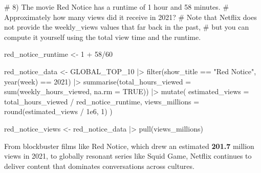 \documentclass[
  12pt,
  letterpaper,
  DIV=11,
  numbers=noendperiod]{scrartcl}
\newenvironment{Shaded}{\begin{snugshade}}{\end{snugshade}}
\newcommand{\AttributeTok}[1]{\textcolor[rgb]{0.40,0.45,0.13}{#1}}
\newcommand{\CommentTok}[1]{\textcolor[rgb]{0.37,0.37,0.37}{#1}}
\newcommand{\ConstantTok}[1]{\textcolor[rgb]{0.56,0.35,0.01}{#1}}
\newcommand{\DecValTok}[1]{\textcolor[rgb]{0.68,0.00,0.00}{#1}}
\newcommand{\FloatTok}[1]{\textcolor[rgb]{0.68,0.00,0.00}{#1}}
\newcommand{\FunctionTok}[1]{\textcolor[rgb]{0.28,0.35,0.67}{#1}}
\newcommand{\NormalTok}[1]{\textcolor[rgb]{0.00,0.23,0.31}{#1}}
\newcommand{\OtherTok}[1]{\textcolor[rgb]{0.00,0.23,0.31}{#1}}
\newcommand{\SpecialCharTok}[1]{\textcolor[rgb]{0.37,0.37,0.37}{#1}}
\newcommand{\StringTok}[1]{\textcolor[rgb]{0.13,0.47,0.30}{#1}}
\begin{document}
\begin{Shaded}
\begin{Highlighting}[]
\CommentTok{\# 8) The movie Red Notice has a runtime of 1 hour and 58 minutes. }
\CommentTok{\# Approximately how many views did it receive in 2021? }
\CommentTok{\# Note that Netflix does not provide the weekly\_views values that far back in the past,}
\CommentTok{\# but you can compute it yourself using the total view time and the runtime.}

\NormalTok{red\_notice\_runtime }\OtherTok{\textless{}{-}} \DecValTok{1} \SpecialCharTok{+} \DecValTok{58}\SpecialCharTok{/}\DecValTok{60}

\NormalTok{red\_notice\_data }\OtherTok{\textless{}{-}}\NormalTok{ GLOBAL\_TOP\_10 }\SpecialCharTok{|\textgreater{}}
  \FunctionTok{filter}\NormalTok{(show\_title }\SpecialCharTok{==} \StringTok{"Red Notice"}\NormalTok{, }
         \FunctionTok{year}\NormalTok{(week) }\SpecialCharTok{==} \DecValTok{2021}\NormalTok{) }\SpecialCharTok{|\textgreater{}}
  \FunctionTok{summarise}\NormalTok{(}\AttributeTok{total\_hours\_viewed =} \FunctionTok{sum}\NormalTok{(weekly\_hours\_viewed, }\AttributeTok{na.rm =} \ConstantTok{TRUE}\NormalTok{)) }\SpecialCharTok{|\textgreater{}}
  \FunctionTok{mutate}\NormalTok{(}
    \AttributeTok{estimated\_views =}\NormalTok{ total\_hours\_viewed }\SpecialCharTok{/}\NormalTok{ red\_notice\_runtime,}
    \AttributeTok{views\_millions =} \FunctionTok{round}\NormalTok{(estimated\_views }\SpecialCharTok{/} \FloatTok{1e6}\NormalTok{, }\DecValTok{1}\NormalTok{)}
\NormalTok{  )}

\NormalTok{red\_notice\_views }\OtherTok{\textless{}{-}}\NormalTok{ red\_notice\_data }\SpecialCharTok{|\textgreater{}} \FunctionTok{pull}\NormalTok{(views\_millions)}
\end{Highlighting}
\end{Shaded}

From blockbuster films like Red Notice, which drew an estimated
\textbf{201.7} million views in 2021, to globally resonant series like
Squid Game, Netflix continues to deliver content that dominates
conversations across cultures.
\end{document}
